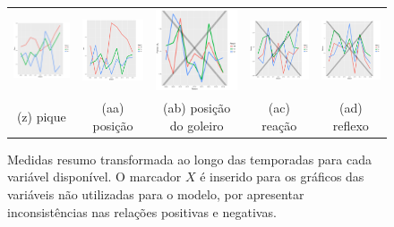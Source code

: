 \documentclass[doc,apacite,oneside,a4paper,12pt]{apa6}
\begin{document}
\begin{figure}
\begin{tabular}{ccccc}
    \includegraphics[width=25mm]{pique_result_trans}  & \includegraphics[width=25mm]{pos_result_trans} & \includegraphics[width=25mm]{posicion_gl_result_trans} &     \includegraphics[width=25mm]{reacao_result_trans}&
  \includegraphics[width=25mm]{reflexos_result_trans}     \\
 \scriptsize{(z) pique} & \scriptsize{(aa) posição}& \scriptsize{(ab) posição do goleiro} & \scriptsize{(ac) reação} & \scriptsize{(ad) reflexo}  \\[3pt]

\end{tabular}
    \caption[\scriptsize{Medidas resumo transformado.}]{\scriptsize{Medidas resumo transformada ao longo das temporadas para cada variável disponível. O marcador $X$ é inserido para os gráficos das variáveis não utilizadas para o modelo, por apresentar inconsistências nas relações positivas e negativas.}}
    \label{fig:medresumotrans}
\end{figure}
\end{document}
